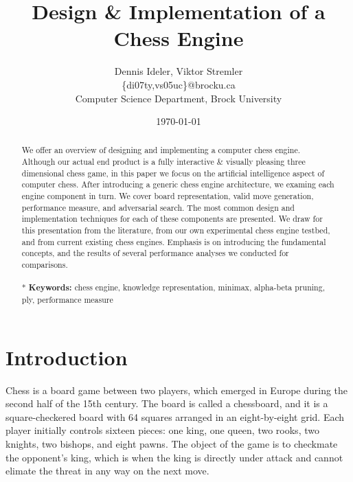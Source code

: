 \documentclass[11pt,letterpaper,twocolumn]{article}
\title{\textbf{Design \& Implementation of a Chess Engine}}
\author{Dennis Ideler, Viktor Stremler \\
\{di07ty,vs05uc\}@brocku.ca\\
Computer Science Department, Brock University}
\date{\today}
\begin{document}
\maketitle

\begin{abstract}
We offer an overview of designing and implementing a computer chess engine. Although our actual end product is a fully interactive \& visually pleasing three dimensional chess game, 
in this paper we focus on the artificial intelligence aspect of computer chess. After introducing a generic chess engine architecture, we examing each engine component in turn.
We cover board representation, valid move generation, performance measure, and adversarial search.
The most common design and implementation techniques for each of these components are presented.
We draw for this presentation from the literature, from our own experimental chess engine testbed, and from current existing chess engines.
Emphasis is on introducing the fundamental concepts, and the results of several performance analyses we conducted for comparisons.
\\ \\* \textbf{Keywords:} chess engine, knowledge representation, minimax, alpha-beta pruning, ply, performance measure
\end{abstract}

\section{Introduction}
Chess is a board game between two players, which emerged in Europe during the second half of the 15th century. The board is called a chessboard, and it is a square-checkered
board with 64 squares arranged in an eight-by-eight grid. Each player initially controls sixteen pieces: one king, one queen, two rooks, two knights, two bishops, and eight pawns.
The object of the game is to checkmate the opponent's king, which is when the king is directly under attack and cannot elimate the threat in any way on the next move.
\end{document}
